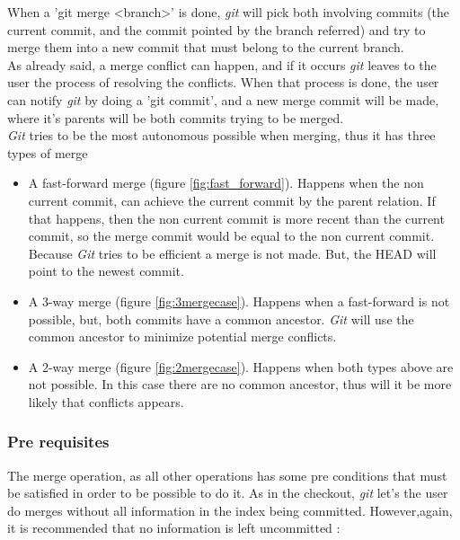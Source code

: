 When a 'git merge <branch>' is done, \emph{git} will pick both involving
commits (the current commit, and the commit pointed by the branch referred)
and try to merge them into a new commit that must belong to the current branch.
\\
As already said, a merge conflict can happen, and if it occurs \emph{git} leaves
to the user the process of resolving the conflicts. When that process is done,
the user can notify \emph{git} by doing a 'git commit', and a new merge commit 
will be made, where it's parents will be both commits trying to be merged. \\
\emph{Git} tries to be the most autonomous possible when merging, thus it has
three types of merge

\begin{itemize}
\item A fast-forward merge (figure \ref{fig:fast_forward}). 
Happens when the non current commit, can achieve the current commit by the 
parent relation. If that happens, then the non current commit is more recent
than the current commit, so the merge commit would be equal to the non current
commit. Because \emph{Git} tries to be efficient a merge is not made. But, the
HEAD will point to the newest commit. 

\item A 3-way merge (figure \ref{fig:3mergecase}). 
Happens when a fast-forward is not possible, but, both commits have a common
ancestor. \emph{Git} will use the common ancestor to minimize potential
merge conflicts.

\item A 2-way merge (figure \ref{fig:2mergecase}). 
Happens when both types above are not possible. In this case there are no
common ancestor, thus will it be more likely that conflicts appears.

\end{itemize}

\subsubsection{Pre requisites}
The merge operation, as all other operations has some pre conditions that
must be satisfied in order to be possible to do it. As in the checkout,
\emph{git} let's the user do merges without all information in the index 
being committed. However,again, it is recommended that no information is 
left uncommitted :

